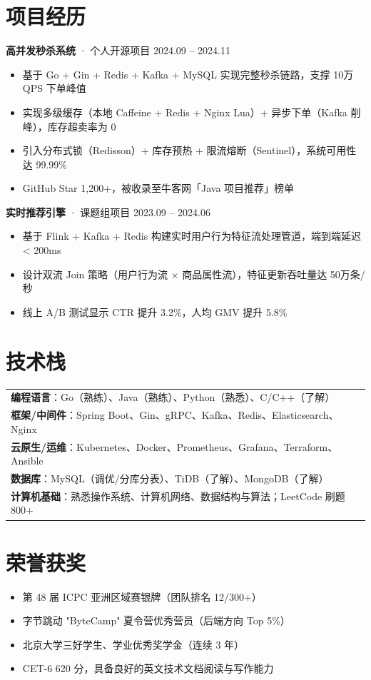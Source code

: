 \documentclass[11pt,a4paper]{article}
\newcommand{\resumeItem}[1]{\item[\textbullet] #1}
\newcommand{\skill}[2]{\textbf{#1}：#2}
\begin{document}
\section{项目经历}

\textbf{高并发秒杀系统} · 个人开源项目 \hfill 2024.09 -- 2024.11
\begin{itemize}[leftmargin=1.2em,itemsep=1pt,topsep=2pt]
\resumeItem{基于 Go + Gin + Redis + Kafka + MySQL 实现完整秒杀链路，支撑 10万 QPS 下单峰值}
\resumeItem{实现多级缓存（本地 Caffeine + Redis + Nginx Lua）+ 异步下单（Kafka 削峰），库存超卖率为 0}
\resumeItem{引入分布式锁（Redisson）+ 库存预热 + 限流熔断（Sentinel），系统可用性达 99.99\%}
\resumeItem{GitHub Star 1,200+，被收录至牛客网「Java 项目推荐」榜单}
\end{itemize}

\textbf{实时推荐引擎} · 课题组项目 \hfill 2023.09 -- 2024.06
\begin{itemize}[leftmargin=1.2em,itemsep=1pt,topsep=2pt]
\resumeItem{基于 Flink + Kafka + Redis 构建实时用户行为特征流处理管道，端到端延迟 < 200ms}
\resumeItem{设计双流 Join 策略（用户行为流 × 商品属性流），特征更新吞吐量达 50万条/秒}
\resumeItem{线上 A/B 测试显示 CTR 提升 3.2\%，人均 GMV 提升 5.8\%}
\end{itemize}

\section{技术栈}

\begin{tabularx}{\textwidth}{@{}lX@{}}
\skill{编程语言}{Go（熟练）、Java（熟练）、Python（熟悉）、C/C++（了解）} \\
\skill{框架/中间件}{Spring Boot、Gin、gRPC、Kafka、Redis、Elasticsearch、Nginx} \\
\skill{云原生/运维}{Kubernetes、Docker、Prometheus、Grafana、Terraform、Ansible} \\
\skill{数据库}{MySQL（调优/分库分表）、TiDB（了解）、MongoDB（了解）} \\
\skill{计算机基础}{熟悉操作系统、计算机网络、数据结构与算法；LeetCode 刷题 800+} \\
\end{tabularx}

\section{荣誉获奖}

\begin{itemize}[leftmargin=1.2em,itemsep=1pt,topsep=2pt]
\resumeItem{第 48 届 ICPC 亚洲区域赛银牌（团队排名 12/300+）}
\resumeItem{字节跳动 "ByteCamp" 夏令营优秀营员（后端方向 Top 5\%）}
\resumeItem{北京大学三好学生、学业优秀奖学金（连续 3 年）}
\resumeItem{CET-6 620 分，具备良好的英文技术文档阅读与写作能力}
\end{itemize}
\end{document}
